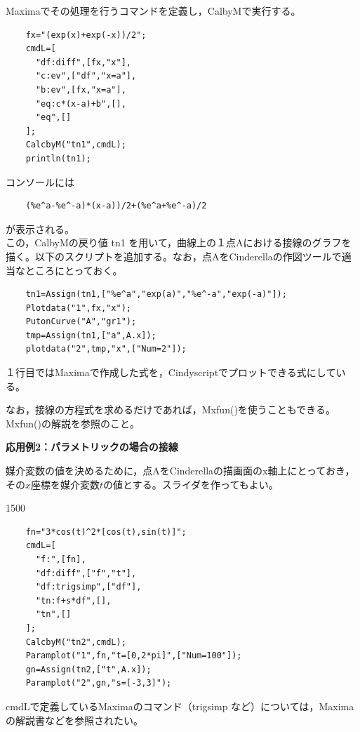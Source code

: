 \documentclass[papersize,a4paper,12pt,uplatex]{jsarticle}
\begin{document}
\begin{description}
Maximaでその処理を行うコマンドを定義し，CalbyMで実行する。
\begin{verbatim}
    fx="(exp(x)+exp(-x))/2";
    cmdL=[
      "df:diff",[fx,"x"],
      "c:ev",["df","x=a"],
      "b:ev",[fx,"x=a"],
      "eq:c*(x-a)+b",[],
      "eq",[]
    ];
    CalcbyM("tn1",cmdL);
    println(tn1);
\end{verbatim}
  コンソールには
\begin{verbatim}
    (%e^a-%e^-a)*(x-a))/2+(%e^a+%e^-a)/2 
\end{verbatim}
が表示される。\\
  この，CalbyMの戻り値 tn1 を用いて，曲線上の１点Aにおける接線のグラフを描く。以下のスクリプトを追加する。なお，点AをCinderellaの作図ツールで適当なところにとっておく。
\begin{verbatim}
    tn1=Assign(tn1,["%e^a","exp(a)","%e^-a","exp(-a)"]);
    Plotdata("1",fx,"x");
    PutonCurve("A","gr1");
    tmp=Assign(tn1,["a",A.x]);
    plotdata("2",tmp,"x",["Num=2"]);
\end{verbatim}
１行目ではMaximaで作成した式を，Cindyscriptでプロットできる式にしている。

\vspace{\baselineskip}
            \begin{center}  \end{center}
\vspace{\baselineskip}
  なお，接線の方程式を求めるだけであれば，Mxfun()を使うこともできる。Mxfun()の解説を参照のこと。
  
\vspace{\baselineskip}
{\bf 応用例2：パラメトリックの場合の接線}

\vspace{\baselineskip}
  媒介変数の値を決めるために，点AをCinderellaの描画面のx軸上にとっておき，その$x$座標を媒介変数$t$の値とする。スライダを作ってもよい。

\begin{layer}{150}{0}
\end{layer}
\begin{verbatim}
    fn="3*cos(t)^2*[cos(t),sin(t)]";
    cmdL=[
      "f:",[fn],
      "df:diff",["f","t"],
      "df:trigsimp",["df"],
      "tn:f+s*df",[],
      "tn",[]
    ];
    CalcbyM("tn2",cmdL);
    Paramplot("1",fn,"t=[0,2*pi]",["Num=100"]);
    gn=Assign(tn2,["t",A.x]);
    Paramplot("2",gn,"s=[-3,3]");
\end{verbatim}

cmdLで定義しているMaximaのコマンド（trigsimp など）については，Maximaの解説書などを参照されたい。
  

\end{description}
\end{document}
